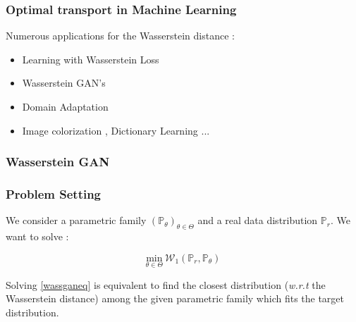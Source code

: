 \documentclass[french,9pt]{beamer}
\begin{document}
\begin{frame}
  \frametitle{Optimal transport in Machine Learning}
  
Numerous applications for the Wasserstein distance :

 \begin{itemize}
 \item Learning with Wasserstein Loss \cite{2015arXiv150605439F} 
 \item Wasserstein GAN's \cite{arjovsky_wgan_2017}
\item Domain Adaptation \cite{courty2017optimal}
\item Image colorization \cite{ferradans2014regularized}, Dictionary Learning \cite{pmlr-v51-rolet16} ... 
 \end{itemize}


\end{frame}



\subsubsection{Wasserstein GAN}

\begin{frame}
\frametitle{Problem Setting \cite{arjovsky_wgan_2017}}
We consider a parametric family $(\mathbb{P}_{\theta})_{\theta \in \Theta}$ and a real data distribution $\mathbb{P}_{r}$. We want to solve :

\begin{equation}
\label{wassganeq}
\underset{\theta \in \Theta}{\text{min}} \  \mathcal{W}_{1}(\mathbb{P}_{r},\mathbb{P}_{\theta})
\end{equation}

Solving \eqref{wassganeq} is equivalent to find the closest distribution (\textit{w.r.t} the Wasserstein distance) among the given parametric family which fits the target distribution.

\end{frame}

\end{document}
